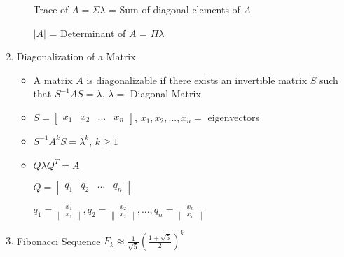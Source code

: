 \documentclass[a4paper]{article}
\begin{document}
\begin{enumerate}
\begin{itemize}
			Trace of $A = \Sigma \lambda$ = Sum of diagonal elements of $A$
			
			$|A|$ = Determinant of $A$ = $\Pi \lambda$ 
		\end{itemize}
		\item Diagonalization of a Matrix
		\begin{itemize}
			\item A matrix $A$ is diagonalizable if there exists an invertible matrix $S$ such that $S^{-1}AS = \lambda$, $\lambda = $ Diagonal Matrix
			\item $S = \begin{bmatrix}x_{1}&x_{2}&...&x_{n}\end{bmatrix}$, $x_{1}, x_{2}, ..., x_{n} =$ eigenvectors
			\item $S^{-1}A^{k}S = \lambda^{k}$, $k \geq 1$
			\item $Q\lambda Q^{T} = A$
			
			$Q = \begin{bmatrix}q_{1}&q_{2}&...&q_{n}\end{bmatrix}$
			
			$q_{1} = \frac{x_{1}}{\begin{Vmatrix}x_{1}\end{Vmatrix}}, q_{2} = \frac{x_{2}}{\begin{Vmatrix}x_{2}\end{Vmatrix}}, ..., q_{n} = \frac{x_{n}}{\begin{Vmatrix}x_{n}\end{Vmatrix}}$
		\end{itemize}
		\item Fibonacci Sequence $F_{k}\approx \frac{1}{\sqrt{5}}(\frac{1+\sqrt{5}}{2})^{k}$
	\end{enumerate}
\end{document}
